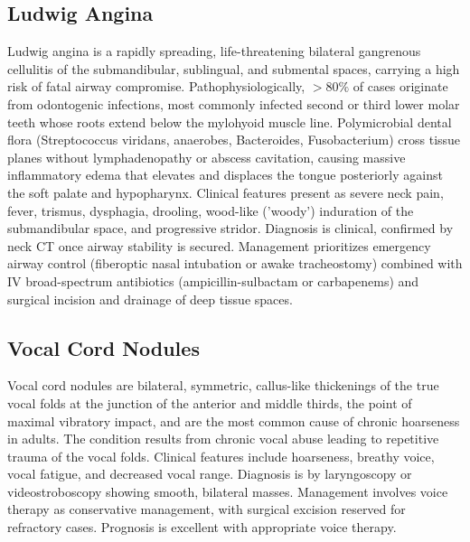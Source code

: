 \subsection{Ludwig Angina}
\label{sec:Ludwig Angina}
Ludwig angina is a rapidly spreading, life-threatening bilateral gangrenous cellulitis of the submandibular, sublingual, and submental spaces, carrying a high risk of fatal airway compromise. Pathophysiologically, $>80\%$ of cases originate from odontogenic infections, most commonly infected second or third lower molar teeth whose roots extend below the mylohyoid muscle line. Polymicrobial dental flora (Streptococcus viridans, anaerobes, Bacteroides, Fusobacterium) cross tissue planes without lymphadenopathy or abscess cavitation, causing massive inflammatory edema that elevates and displaces the tongue posteriorly against the soft palate and hypopharynx. Clinical features present as severe neck pain, fever, trismus, dysphagia, drooling, wood-like ('woody') induration of the submandibular space, and progressive stridor. Diagnosis is clinical, confirmed by neck CT once airway stability is secured. Management prioritizes emergency airway control (fiberoptic nasal intubation or awake tracheostomy) combined with IV broad-spectrum antibiotics (ampicillin-sulbactam or carbapenems) and surgical incision and drainage of deep tissue spaces.

\subsection{Vocal Cord Nodules}
\label{sec:Vocal Cord Nodules}
Vocal cord nodules are bilateral, symmetric, callus-like thickenings of the true vocal folds at the junction of the anterior and middle thirds, the point of maximal vibratory impact, and are the most common cause of chronic hoarseness in adults. The condition results from chronic vocal abuse leading to repetitive trauma of the vocal folds. Clinical features include hoarseness, breathy voice, vocal fatigue, and decreased vocal range. Diagnosis is by laryngoscopy or videostroboscopy showing smooth, bilateral masses. Management involves voice therapy as conservative management, with surgical excision reserved for refractory cases. Prognosis is excellent with appropriate voice therapy.

